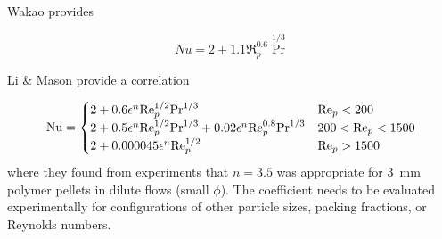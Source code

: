 













Wakao provides

\begin{equation}
	Nu = 2 + 1.1\Re_p^{0.6} \Pr^{1/3}
\end{equation}






Li \& Mason provide a correlation 

\begin{equation}
	\mathrm{Nu} = \begin{cases}
	2+ 0.6\epsilon^n\mathrm{Re}_p^{1/2}\mathrm{Pr}^{1/3} 										& \mathrm{Re}_p < 200\\
	2+ 0.5\epsilon^n\mathrm{Re}_p^{1/2}\mathrm{Pr}^{1/3} + 0.02 \epsilon^n \mathrm{Re}_p^{0.8}\mathrm{Pr}^{1/3} & 200 < \mathrm{Re}_p < 1500\\
	2+ 0.000045\epsilon^n\mathrm{Re}_p^{1/2}			 								& \mathrm{Re}_p > 1500
	\end{cases}
\end{equation}
where they found from experiments that $n=3.5$ was appropriate for 3~mm polymer pellets in dilute flows (small $\phi$). The coefficient needs to be evaluated experimentally for configurations of other particle sizes, packing fractions, or Reynolds numbers.\cite{Li2000}

